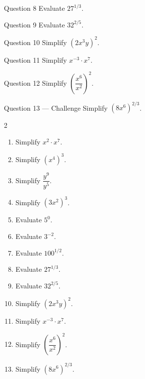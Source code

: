 \documentclass[11pt]{article}
\begin{document}
\begin{qbox}{Question 8}
Evaluate $27^{1/3}$.\workspace{2.4cm}
\end{qbox}

\begin{qbox}{Question 9}
Evaluate $32^{2/5}$.\workspace{2.4cm}
\end{qbox}

\begin{qbox}{Question 10}
Simplify $(2x^3y)^2$.\workspace{2.4cm}
\end{qbox}

\begin{qbox}{Question 11}
Simplify $x^{-3}\cdot x^{7}$.\workspace{2.4cm}
\end{qbox}

\begin{qbox}{Question 12}
Simplify $\left(\dfrac{x^6}{x^2}\right)^2$.\workspace{3cm}
\end{qbox}

\begin{qbox}{Question 13 --- Challenge}
Simplify $(8x^6)^{2/3}$.\workspace{3cm}
\end{qbox}

\clearpage
{}

\begin{recapbox}
\begin{multicols}{2}
\small
\begin{enumerate}[leftmargin=*,itemsep=3pt]
  \item Simplify $x^2\cdot x^7$.
  \item Simplify $(x^4)^3$.
  \item Simplify $\dfrac{y^9}{y^5}$.
  \item Simplify $(3x^2)^3$.
  \item Evaluate $5^0$.
  \item Evaluate $3^{-2}$.
  \item Evaluate $100^{1/2}$.
  \item Evaluate $27^{1/3}$.
  \item Evaluate $32^{2/5}$.
  \item Simplify $(2x^3y)^2$.
  \item Simplify $x^{-3}\cdot x^{7}$.
  \item Simplify $\left(\dfrac{x^6}{x^2}\right)^2$.
  \item Simplify $(8x^6)^{2/3}$.
\end{enumerate}
\end{multicols}
\end{recapbox}
\end{document}
